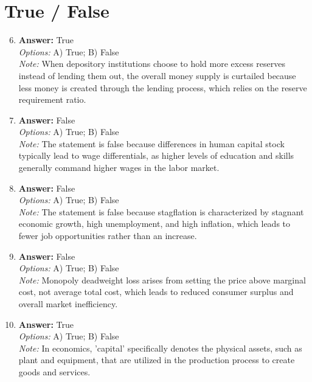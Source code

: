 \documentclass[12pt]{article}
\begin{document}
\section*{True / False}
\begin{enumerate}[label=\arabic*.]
\setcounter{enumi}{5}
\item \textbf{Answer:} True
\\ \textit{Options:} A) True; B) False
\\ \textit{Note:} When depository institutions choose to hold more excess reserves instead of lending them out, the overall money supply is curtailed because less money is created through the lending process, which relies on the reserve requirement ratio.
\item \textbf{Answer:} False
\\ \textit{Options:} A) True; B) False
\\ \textit{Note:} The statement is false because differences in human capital stock typically lead to wage differentials, as higher levels of education and skills generally command higher wages in the labor market.
\item \textbf{Answer:} False
\\ \textit{Options:} A) True; B) False
\\ \textit{Note:} The statement is false because stagflation is characterized by stagnant economic growth, high unemployment, and high inflation, which leads to fewer job opportunities rather than an increase.
\item \textbf{Answer:} False
\\ \textit{Options:} A) True; B) False
\\ \textit{Note:} Monopoly deadweight loss arises from setting the price above marginal cost, not average total cost, which leads to reduced consumer surplus and overall market inefficiency.
\item \textbf{Answer:} True
\\ \textit{Options:} A) True; B) False
\\ \textit{Note:} In economics, 'capital' specifically denotes the physical assets, such as plant and equipment, that are utilized in the production process to create goods and services.
\end{enumerate}
\end{document}

